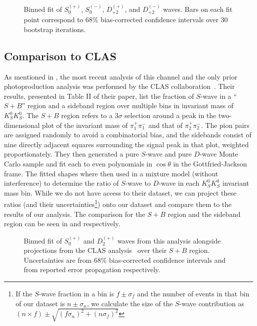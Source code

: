 \begin{figure}
  \begin{center}
    
  \end{center}
  \caption{Binned fit of $S_{0}^{(+)}$, $S_{0}^{(-)}$, $D_{+2}^{(+)}$, and $D_{+2}^{(-)}$ waves. Bars on each fit point correspond to $68\%$ bias-corrected confidence intervals over $ 30 $ bootstrap iterations.}\label{fig:binned-fit-chisqdof-3.0-Spn-D2pn}
\end{figure}

\subsection{Comparison to CLAS}\label{sub:comparison-to-clas}
As mentioned in , the most recent analysis of this channel and the only prior photoproduction analysis was performed by the CLAS collaboration~\cite{Chandavar2018}. Their results, presented in Table II of their paper, list the fraction of $S$-wave in a ``$S+B$'' region and a sideband region over multiple bins in invariant mass of $K_S^0K_S^0$. The $S+B$ region refers to a $3\sigma$ selection around a peak in the two-dimensional plot of the invariant mass of $\pi_1^+\pi_1^-$ and that of $\pi_2^+\pi_2^-$. The pion pairs are assigned randomly to avoid a combinatorial bias, and the sidebands consist of nine directly adjacent squares surrounding the signal peak in that plot, weighted proportionately. They then generated a pure $S$-wave and pure $D$-wave Monte Carlo sample and fit each to even polynomials in $\cos\theta$ in the Gottfried-Jackson frame. The fitted shapes where then used in a mixture model (without interference) to determine the ratio of $S$-wave to $D$-wave in each $K_S^0K_S^0$ invariant mass bin. While we do not have access to their dataset, we can project these ratios (and their uncertainties\footnote{If the $S$-wave fraction in a bin is $f\pm\sigma_f$ and the number of events in that bin of our dataset is $n\pm\sigma_n$, we calculate the size of the $S$-wave contribution as $(n\times f) \pm \sqrt{(f\sigma_n)^2 + (n\sigma_f)^2}$}) onto our dataset and compare them to the results of our analysis. The comparison for the $S+B$ region and the sideband region can be seen in  and  respectively.

\begin{figure}
  \begin{center}
    
  \end{center}
  \caption{Binned fit of $S_0^{(+)}$ and $D_2^{(+)}$ waves from this analysis alongside projections from the CLAS analysis~\cite{Chandavar2018} over their $S+B$ region. Uncertainties are from $68\%$ bias-corrected confidence intervals and from reported error propagation respectively.}\label{fig:clas-comparison-SB}
\end{figure}

